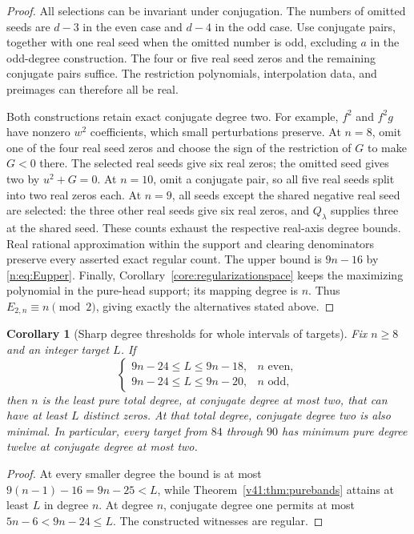 \documentclass[UTF8,11pt]{ctexart}
\newtheorem{cor}[thm]{Corollary}
\theoremstyle{definition}
\numberwithin{equation}{section}
\begin{document}
\begin{proof}
All selections can be invariant under conjugation. The numbers
of omitted seeds are $d-3$ in the even case and $d-4$ in
the odd case. Use conjugate pairs, together with one real
seed when the omitted number is odd, excluding $a$ in the
odd-degree construction. The four or five real seed zeros
and the remaining conjugate pairs suffice. The restriction
polynomials, interpolation data, and preimages can therefore
all be real.

Both constructions retain exact conjugate degree two.
For example, $f^2$ and $f^2g$ have nonzero $w^2$
coefficients, which small perturbations preserve.
At $n=8$, omit one of the four real seed zeros and choose
the sign of the restriction of $G$ to make $G<0$ there.
The selected real seeds give six real zeros; the omitted
seed gives two by $u^2+G=0$. At $n=10$, omit a conjugate
pair, so all five real seeds split into two real zeros each.
At $n=9$, all seeds except the shared negative real seed
are selected: the three other real seeds give six real
zeros, and $Q_\lambda$ supplies three at the shared seed.
These counts exhaust the respective real-axis degree bounds.
Real rational approximation within the support and clearing
denominators preserve every asserted exact regular count.
The upper bound is $9n-16$ by \eqref{n:eq:Eupper}.
Finally, Corollary~\ref{core:regularizationspace} keeps
the maximizing polynomial in the pure-head support;
its mapping degree is $n$. Thus $E_{2,n}\equiv n\pmod2$,
giving exactly the alternatives stated above.
\end{proof}

\begin{cor}[Sharp degree thresholds for whole intervals of targets]
\label{v41:cor:degreewindows}
Fix $n\ge8$ and an integer target $L$. If
\[
 \begin{cases}
 9n-24\le L\le9n-18,&n\text{ even},\\
 9n-24\le L\le9n-20,&n\text{ odd},
 \end{cases}
\]
then $n$ is the least pure total degree, at conjugate degree
at most two, that can have at least $L$ distinct zeros.
At that total degree, conjugate degree two is also minimal.
In particular, every target from $84$ through $90$ has
minimum pure degree twelve at conjugate degree at most two.
\end{cor}
\begin{proof}
At every smaller degree the bound is at most
$9(n-1)-16=9n-25<L$, while Theorem~\ref{v41:thm:purebands}
attains at least $L$ in degree $n$. At degree $n$,
conjugate degree one permits at most $5n-6<9n-24\le L$.
The constructed witnesses are regular.
\end{proof}
\end{document}
